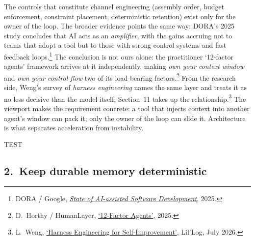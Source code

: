 \documentclass[11pt, a4paper]{article}
\newcommand{\principletest}[1]{%
  \par\vskip3pt\noindent
  {\labelfont\fontsize{8}{10}\selectfont\color{indigo}TEST}\hspace{7pt}{\itshape #1}\par}
\begin{document}
The controls that constitute channel engineering (assembly order, budget enforcement,
constraint placement, deterministic retention) exist only for the owner of the loop. The
broader evidence points the same way: DORA's 2025 study concludes that AI acts as an
\emph{amplifier}, with the gains accruing not to teams that adopt a tool but to those
with strong control systems and fast feedback
loops.\footnote{DORA / Google, \href{https://dora.dev/dora-report-2025/}{\textit{State of AI-assisted Software Development}}, 2025.}
The conclusion is not ours alone: the practitioner `12-factor agents' framework arrives at
it independently, making \emph{own your context window} and \emph{own your control flow}
two of its load-bearing factors.\footnote{D.~Horthy / HumanLayer,
\href{https://github.com/humanlayer/12-factor-agents}{`12-Factor Agents'}, 2025.}
From the research side, Weng's survey of \emph{harness engineering} names the same layer
and treats it as no less decisive than the model itself; Section~11 takes up the
relationship.\footnote{L.~Weng,
\href{https://lilianweng.github.io/posts/2026-07-04-harness/}{`Harness Engineering for
Self-Improvement'}, Lil'Log, July 2026.}
The viewport makes the requirement concrete: a tool that injects context into another
agent's window can pack it; only the owner of the loop can slide it.
Architecture is what separates acceleration from instability.

\principletest{If you cannot change assembly order, budget, or retention without another vendor's permission, you do not own the loop; you are a guest in it.}

\subsection*{2.~Keep durable memory deterministic}
\end{document}
